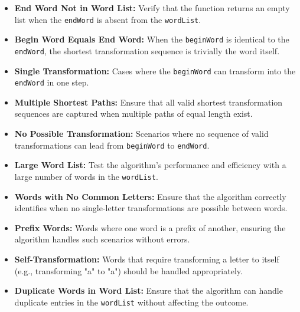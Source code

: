 \begin{itemize}
    \item \textbf{End Word Not in Word List:} Verify that the function returns an empty list when the \texttt{endWord} is absent from the \texttt{wordList}.
    
    \item \textbf{Begin Word Equals End Word:} When the \texttt{beginWord} is identical to the \texttt{endWord}, the shortest transformation sequence is trivially the word itself.
    
    \item \textbf{Single Transformation:} Cases where the \texttt{beginWord} can transform into the \texttt{endWord} in one step.
    
    \item \textbf{Multiple Shortest Paths:} Ensure that all valid shortest transformation sequences are captured when multiple paths of equal length exist.
    
    \item \textbf{No Possible Transformation:} Scenarios where no sequence of valid transformations can lead from \texttt{beginWord} to \texttt{endWord}.
    
    \item \textbf{Large Word List:} Test the algorithm's performance and efficiency with a large number of words in the \texttt{wordList}.
    
    \item \textbf{Words with No Common Letters:} Ensure that the algorithm correctly identifies when no single-letter transformations are possible between words.
    
    \item \textbf{Prefix Words:} Words where one word is a prefix of another, ensuring the algorithm handles such scenarios without errors.
    
    \item \textbf{Self-Transformation:} Words that require transforming a letter to itself (e.g., transforming "a" to "a") should be handled appropriately.
    
    \item \textbf{Duplicate Words in Word List:} Ensure that the algorithm can handle duplicate entries in the \texttt{wordList} without affecting the outcome.
\end{itemize}

\printindex